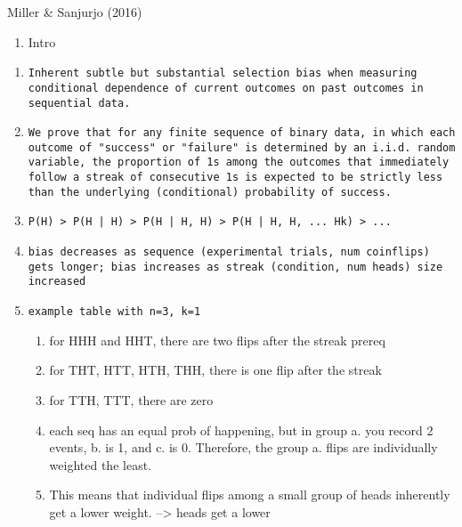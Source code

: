 \documentclass[12pt,twoside]{dukestatscithesis}
\providecommand{\tightlist}{%
  \setlength{\itemsep}{0pt}\setlength{\parskip}{0pt}}
\theoremstyle{definition}
\theoremstyle{definition}
\theoremstyle{definition}
\theoremstyle{remark}
\begin{document}
Miller \& Sanjurjo (2016)
\begin{enumerate}
\def\labelenumi{\Alph{enumi}.}
\tightlist
\item
  Intro
\end{enumerate}
\begin{enumerate}
\def\labelenumi{\arabic{enumi}.}
\item
\begin{verbatim}
Inherent subtle but substantial selection bias when measuring conditional dependence of current outcomes on past outcomes in sequential data.
\end{verbatim}
\item
\begin{verbatim}
We prove that for any finite sequence of binary data, in which each outcome of "success" or "failure" is determined by an i.i.d. random variable, the proportion of 1s among the outcomes that immediately follow a streak of consecutive 1s is expected to be strictly less than the underlying (conditional) probability of success.
\end{verbatim}
\item
\begin{verbatim}
P(H) > P(H | H) > P(H | H, H) > P(H | H, H, ... Hk) > ...
\end{verbatim}
\item
\begin{verbatim}
bias decreases as sequence (experimental trials, num coinflips) gets longer; bias increases as streak (condition, num heads) size increased
\end{verbatim}
\item
\begin{verbatim}
example table with n=3, k=1
\end{verbatim}
  \begin{enumerate}
  \def\labelenumii{\alph{enumii}.}
  \tightlist
  \item
    for HHH and HHT, there are two flips after the streak prereq
  \item
    for THT, HTT, HTH, THH, there is one flip after the streak
  \item
    for TTH, TTT, there are zero
  \item
    each seq has an equal prob of happening, but in group a. you record
    2 events, b. is 1, and c. is 0. Therefore, the group a. flips are
    individually weighted the least.
  \item
    This means that individual flips among a small group of heads
    inherently get a lower weight. --\textgreater{} heads get a lower

\end{enumerate}
\end{enumerate}
\end{document}
